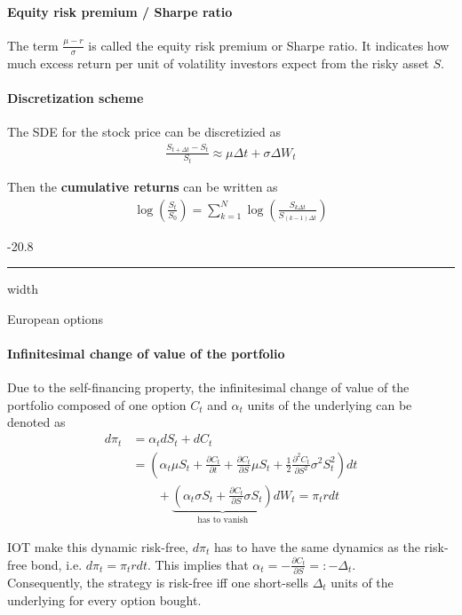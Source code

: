 \documentclass[a4paper,landscape,7pt,fleqn]{scrartcl}
\makeatletter
\renewcommand{\emph}[1]{\textbf{#1}}
\renewcommand{\subsubsection}{\@startsection{subsubsection}{1}{0mm}%
{-2\baselineskip}{0.8\baselineskip}%
{\hrule depth 0.2pt width\columnwidth\vspace*{1.2em}\normalsize\bfseries}}
\makeatother
\begin{document}
\begin{multicols*}{3}
\paragraph{Equity risk premium / Sharpe ratio}
The term $\frac{\mu - r}{\sigma}$ is called the equity risk premium or Sharpe ratio. It indicates how much excess return per unit of volatility investors expect from the risky asset $S$.

\paragraph{Discretization scheme}
The SDE for the stock price can be discretizied as
\begin{align*}
\frac{S_{t+\Delta t} - S_t}{S_t} \approx \mu \Delta t + \sigma \Delta W_t
\end{align*}

Then the \emph{cumulative returns} can be written as
\begin{align*}
\log \left( \frac{S_t}{S_0} \right) = \sum_{k=1}^N \log \left( \frac{S_{k \Delta t}}{S_{(k-1) \Delta t}} \right)
\end{align*}

\subsubsection{European options}

\paragraph{Infinitesimal change of value of the portfolio}
Due to the self-financing property, the infinitesimal change of value of the portfolio composed of one option $C_t$ and $\alpha_t$ units of the underlying can be denoted as
\begin{align*}
d\pi_t &= \alpha_t dS_t + dC_t \\
&= \left( \alpha_t \mu S_t + \frac{\partial C_t}{\partial t} + \frac{\partial C_t}{\partial S} \mu S_t + \frac{1}{2} \frac{\partial^2 C_t}{\partial S^2} \sigma^2 S_t^2 \right) dt \\
& \qquad + \underbrace{\left( \alpha_t \sigma S_t + \frac{\partial C_t}{\partial S} \sigma S_t \right)}\limits_\text{has to vanish} dW_t = \pi_t r dt
\end{align*}

IOT make this dynamic risk-free, $d\pi_t$ has to have the same dynamics as the risk-free bond, i.e. $d\pi_t = \pi_t r dt$. This implies that $\alpha_t = - \frac{\partial C_t}{\partial S} =: -\Delta_t$. \\
Consequently, the strategy is risk-free iff one short-sells $\Delta_t$ units of the underlying for every option bought.


\end{multicols*}
\end{document}
